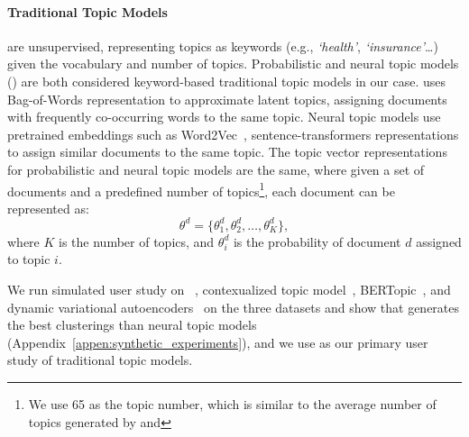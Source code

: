 \paragraph{Traditional Topic Models} are unsupervised, representing topics as keywords (e.g., \textit{`health'}, \textit{`insurance'}\dots) given the vocabulary and number of topics.
%
Probabilistic and neural topic models (\lda{}) are both considered keyword-based traditional topic models in our case.
%
\lda{} uses Bag-of-Words representation to approximate latent topics,
assigning documents with frequently co-occurring words to the same
topic. 
%
Neural topic models use pretrained embeddings such as Word2Vec~\cite{word2vec}, sentence-transformers representations to assign similar documents to the same topic.
%
The topic vector representations for probabilistic and neural topic models are the same, where given a set of documents and a predefined number of topics\footnote{We use \num{65} as the topic number, which is similar to the average number of topics generated by \lloom{} and \topicgpt{}}, each document can be represented as:
\begin{equation}
\theta^d = \{\theta^d_1, \theta^d_2, \ldots, \theta^d_K\},
\end{equation}
where $K$ is the number of topics, and $\theta^d_i$ is the probability of document $d$ assigned to topic $i$.


%
We run simulated user study on \mallet{} \lda{}~\cite{mallet}, contexualized topic model~\cite{kitty_CTM}, BERTopic~\cite{bertopicMark}, and dynamic variational autoencoders~\cite{Girin_2021} on the three datasets and show that \lda{} generates the best clusterings than neural topic models (Appendix~\ref{appen:synthetic_experiments}), and we use \lda{} as our primary user study of traditional topic models.



